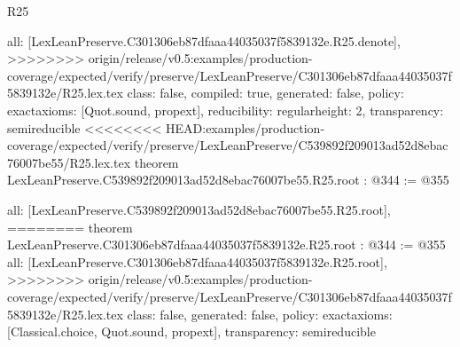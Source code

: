 \begin{lexlean}{R25}
\begin{coremodule}
{{{{{  all: [LexLeanPreserve.C301306eb87dfaaa44035037f5839132e.R25.denote],
>>>>>>>> origin/release/v0.5:examples/production-coverage/expected/verify/preserve/LexLeanPreserve/C301306eb87dfaaa44035037f5839132e/R25.lex.tex
  class: false,
  compiled: true,
  generated: false,
  policy: exact{axioms: [Quot.sound, propext]},
  reducibility: regular{height: 2},
  transparency: semireducible
}
<<<<<<<< HEAD:examples/production-coverage/expected/verify/preserve/LexLeanPreserve/C539892f209013ad52d8ebac76007be55/R25.lex.tex
theorem LexLeanPreserve.C539892f209013ad52d8ebac76007be55.R25.root : @344 := @355 {
  all: [LexLeanPreserve.C539892f209013ad52d8ebac76007be55.R25.root],
========
theorem LexLeanPreserve.C301306eb87dfaaa44035037f5839132e.R25.root : @344 := @355 {
  all: [LexLeanPreserve.C301306eb87dfaaa44035037f5839132e.R25.root],
>>>>>>>> origin/release/v0.5:examples/production-coverage/expected/verify/preserve/LexLeanPreserve/C301306eb87dfaaa44035037f5839132e/R25.lex.tex
  class: false,
  generated: false,
  policy: exact{axioms: [Classical.choice, Quot.sound, propext]},
  transparency: semireducible
}

}}}}}
\end{coremodule}
\end{lexlean}
